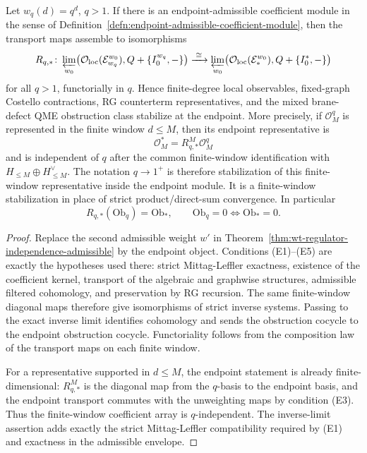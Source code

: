 \begin{thm}
\label{thm:wt-endpoint-stabilization-criterion}
  Let \(w_q(d)=q^d\), \(q>1\).  If there is an endpoint-admissible
  coefficient module in the sense of
  Definition~\ref{defn:endpoint-admissible-coefficient-module}, then
  the transport maps assemble to isomorphisms
  \[
    R_{q,\ast}\colon
    \varprojlim_{w_0}
    \bigl(\mathcal O_{\mathrm{loc}}(\mathcal E_{w_q}^{w_0}),
      Q+\{I_0^{w_q},-\}\bigr)
    \xrightarrow{\;\cong\;}
    \varprojlim_{w_0}
    \bigl(\mathcal O_{\mathrm{loc}}(\mathcal E_{\ast}^{w_0}),
      Q+\{I_0^{\ast},-\}\bigr)
  \]
  for all \(q>1\), functorially in \(q\).  Hence finite-degree local
  observables, fixed-graph Costello contractions, RG counterterm
  representatives, and the mixed brane-defect QME obstruction class
  stabilize at the endpoint.  More precisely, if
  \(\mathcal O^q_M\) is represented in the finite window \(d\leq M\),
  then its endpoint representative is
  \[
    \mathcal O^\ast_M=R^M_{q,\ast}\mathcal O^q_M
  \]
  and is independent of \(q\) after the common finite-window
  identification with \(H_{\leq M}\oplus H^\vee_{\leq M}\).  The notation
	  \(q\to1^+\) is therefore stabilization of this finite-window
	  representative inside the endpoint module.  It is a finite-window
  stabilization in place of strict product/direct-sum convergence.  In particular
  \[
    R_{q,\ast}(\mathrm{Ob}_{q})=\mathrm{Ob}_{\ast},
    \qquad
    \mathrm{Ob}_{q}=0\Longleftrightarrow \mathrm{Ob}_{\ast}=0 .
  \]
\end{thm}

\begin{proof}
  Replace the second admissible weight \(w'\) in
  Theorem~\ref{thm:wt-regulator-independence-admissible} by the
  endpoint object.  Conditions (E1)--(E5) are exactly the hypotheses
  used there: strict Mittag-Leffler exactness, existence of the
  coefficient kernel, transport of the algebraic and graphwise
  structures, admissible filtered cohomology, and preservation by RG
  recursion.  The same finite-window diagonal maps therefore give
  isomorphisms of strict inverse systems.  Passing to the exact inverse
  limit identifies cohomology and sends the obstruction cocycle to the
  endpoint obstruction cocycle.  Functoriality follows from the
  composition law of the transport maps on each finite window.

  For a representative supported in \(d\leq M\), the endpoint statement is
  already finite-dimensional: \(R^M_{q,\ast}\) is the diagonal map from
	  the \(q\)-basis to the endpoint basis, and the endpoint transport
	  commutes with the unweighting maps by condition (E3).  Thus the
	  finite-window coefficient array is \(q\)-independent.
  The inverse-limit assertion adds exactly the strict Mittag-Leffler
  compatibility required by (E1) and exactness in the admissible envelope.
\end{proof}

